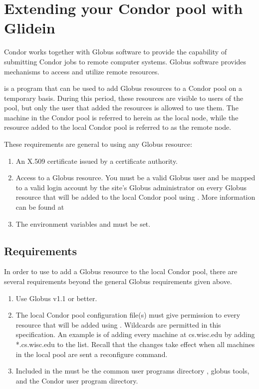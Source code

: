 \section{\label{sec:Glidein}Extending your Condor pool with Glidein}

Condor works together with Globus software to provide the capability
of submitting Condor jobs to remote computer systems.
Globus software provides mechanisms to access and utilize
remote resources.

 is a program that can be used to add Globus resources
to a Condor pool on a temporary basis.
During this period, these resources are visible 
to users of the pool, but only the user
that added the resources is allowed to use them.
The machine in the Condor pool is referred to herein as the
local node, while the resource added to the local Condor pool
is referred to as the remote node.

These requirements are general to using any Globus resource:
\begin{enumerate}

\item An X.509 certificate issued by a certificate authority.

\item Access to a Globus resource.
You must be a valid Globus user and be mapped to a valid login account by
the site's Globus administrator on every Globus resource that will be
added to the local Condor pool using .
More information can be found at 

\item The environment variables  and 
must be set.

\end{enumerate}


\subsection{ Requirements}
In order to use  to add a Globus resource to the
local Condor pool,
there are several requirements beyond the general Globus requirements
given above.

\begin{enumerate}
\item Use Globus v1.1 or better.

\item The local Condor pool configuration file(s) must 
  give  permission
  to every resource that will be added using . 
  Wildcards are permitted in this specification.
  An example is of adding every machine at
  cs.wisc.edu by adding *.cs.wisc.edu to the
   list.
  Recall that the changes take effect when all machines
  in the local pool are sent a reconfigure command.

\item Included in the  must be the common user programs
  directory , globus tools, and the Condor user program
  directory.

\end{enumerate}

